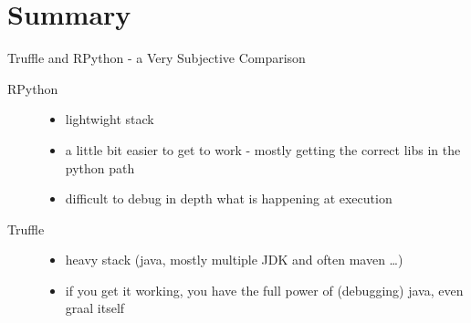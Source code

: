 \documentclass[xcolor=dvipsname,handout]{beamer} %
\begin{document}
\section{Summary}

\begin{frame}{Truffle and RPython - a Very Subjective Comparison}
\begin{description}
 \item[RPython] \begin{itemize}
  \item lightwight stack
  \item a little bit easier to get to work - mostly getting the correct libs in the python path
  \item difficult to debug in depth what is happening at execution
\end{itemize}
\item[Truffle] \begin{itemize}
  \item heavy stack (java, mostly multiple JDK and often maven \dots)
  \item if you get it working, you have the full power of (debugging) java, even graal itself
\end{itemize}
\end{description}
\end{frame}
\end{document}
